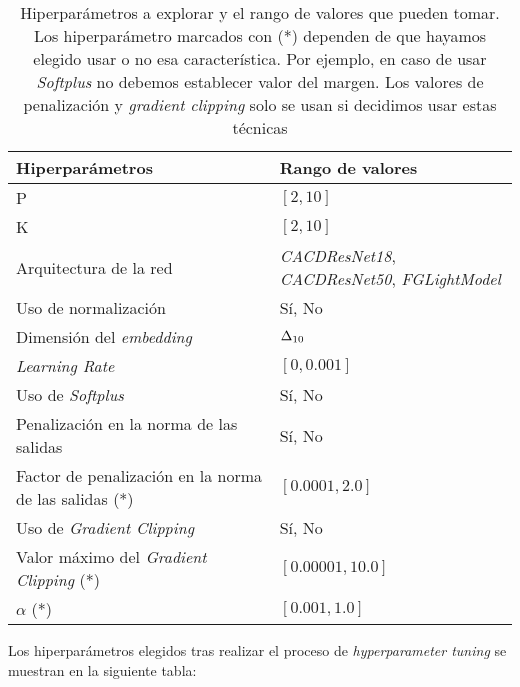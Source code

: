 \begin{table}[H]
\centering
    \begin{tabular}{|l|l|}
    \hline
    \textbf{Hiperparámetros} & \textbf{Rango de valores} \\
    \hline

    P & $[2, 10]$ \\
    K & $[2, 10]$ \\
    Arquitectura de la red & \textit{CACDResNet18}, \textit{CACDResNet50}, \textit{FGLightModel} \\
    Uso de normalización & Sí, No \\
    Dimensión del \textit{embedding} & $\Delta_{10}$ \\
    \textit{Learning Rate} & $[0, 0.001]$ \\
    Uso de \textit{Softplus} & Sí, No \\
    Penalización en la norma de las salidas & Sí, No \\
    Factor de penalización en la norma de las salidas (*) & $[0.0001, 2.0]$ \\
    Uso de \textit{Gradient Clipping} & Sí, No \\
    Valor máximo del \textit{Gradient Clipping} (*) & $[0.00001, 10.0]$ \\
    $\alpha$ (*) & $[0.001, 1.0]$ \\

    \hline

\end{tabular}
\caption{Hiperparámetros a explorar y el rango de valores que pueden tomar. Los hiperparámetro marcados con (*) dependen de que hayamos elegido usar o no esa característica. Por ejemplo, en caso de usar \textit{Softplus} no debemos establecer valor del margen. Los valores de penalización y \textit{gradient clipping} solo se usan si decidimos usar estas técnicas}
\end{table}


Los hiperparámetros elegidos tras realizar el proceso de \textit{hyperparameter tuning} se muestran en la siguiente tabla:

